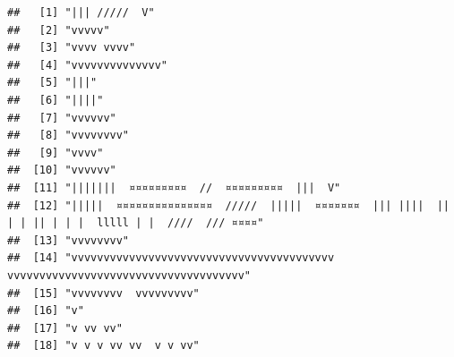 \documentclass[
]{article}
\begin{document}
\begin{verbatim}
##   [1] "||| /////  V"                                                                                                                             
##   [2] "vvvvv"                                                                                                                                    
##   [3] "vvvv vvvv"                                                                                                                                
##   [4] "vvvvvvvvvvvvvv"                                                                                                                           
##   [5] "|||"                                                                                                                                      
##   [6] "||||"                                                                                                                                     
##   [7] "vvvvvv"                                                                                                                                   
##   [8] "vvvvvvvv"                                                                                                                                 
##   [9] "vvvv"                                                                                                                                     
##  [10] "vvvvvv"                                                                                                                                   
##  [11] "|||||||  ¤¤¤¤¤¤¤¤¤  //  ¤¤¤¤¤¤¤¤¤  |||  V"                                                                                                
##  [12] "|||||  ¤¤¤¤¤¤¤¤¤¤¤¤¤¤¤  /////  |||||  ¤¤¤¤¤¤¤  ||| ||||  ||  | | || | | |  lllll | |  ////  /// ¤¤¤¤"                                     
##  [13] "vvvvvvvv"                                                                                                                                 
##  [14] "vvvvvvvvvvvvvvvvvvvvvvvvvvvvvvvvvvvvvvvvv  vvvvvvvvvvvvvvvvvvvvvvvvvvvvvvvvvvvvv"                                                         
##  [15] "vvvvvvvv  vvvvvvvvv"                                                                                                                      
##  [16] "v"                                                                                                                                        
##  [17] "v vv vv"                                                                                                                                  
##  [18] "v v v vv vv  v v vv"                                                                                                                      

\end{verbatim}
\end{document}
